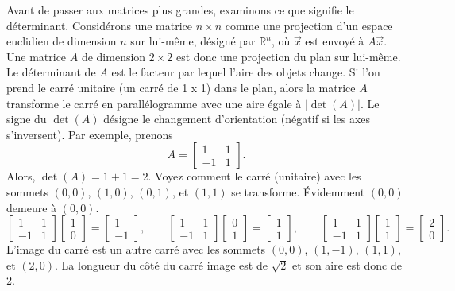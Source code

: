 Avant de passer aux matrices plus grandes, examinons ce que signifie le déterminant. Considérons une matrice $n \times n$
comme une projection d’un espace euclidien de dimension $n$ sur lui-même, désigné par ${\mathbb{R}}^n$, où $\vec{x}$ est envoyé à $A \vec{x}$.
Une matrice $A$ de dimension $2 \times 2$ est donc une projection du plan sur lui-même. Le déterminant de 
$A$ est le facteur par lequel l’aire des objets change. Si l'on prend le carré unitaire (un carré de 1 x 1) dans le plan, alors la matrice
$A$ transforme le carré en parallélogramme avec une aire égale à $\lvert\det(A)\rvert$.  Le signe
du $\det(A)$ désigne le changement d'orientation (négatif si les axes s’inversent). Par exemple, prenons
\begin{equation*}
A =
\begin{bmatrix}
1 & 1 \\
-1 & 1
\end{bmatrix} .
\end{equation*}
Alors, $\det(A) = 1+1 = 2$.  Voyez comment le carré (unitaire) avec les sommets
$(0,0)$, $(1,0)$, $(0,1)$, et $(1,1)$ se transforme.  Évidemment $(0,0)$ demeure à $(0,0)$.  
\begin{equation*}
\begin{bmatrix}
1 & 1 \\
-1 & 1
\end{bmatrix}
\begin{bmatrix}
1 \\ 0
\end{bmatrix} =
\begin{bmatrix}
1 \\
-1 
\end{bmatrix}
,
\qquad
\begin{bmatrix}
1 & 1 \\
-1 & 1
\end{bmatrix}
\begin{bmatrix}
0 \\ 1
\end{bmatrix} =
\begin{bmatrix}
1 \\
1 
\end{bmatrix}
,
\qquad
\begin{bmatrix}
1 & 1 \\
-1 & 1
\end{bmatrix}
\begin{bmatrix}
1 \\ 1
\end{bmatrix} =
\begin{bmatrix}
2 \\
0 
\end{bmatrix}
.
\end{equation*}
L’image du carré est un autre carré avec les sommets $(0,0)$, $(1,-1)$,
$(1,1)$, et $(2,0)$. La longueur du côté du carré image est de $\sqrt{2}$ et son aire est donc de 2.

